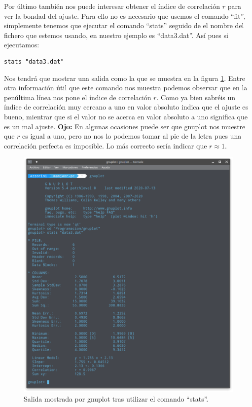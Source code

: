 \documentclass[11pt,a4paper,twoside,pdf]{article}
\numberwithin{equation}{section}
\begin{document}
Por último también nos puede interesar obtener el índice de correlación $r$ para ver la bondad del ajuste. Para ello no es necesario que usemos el comando ``fit'', simplemente tenemos que ejecutar el comando ``stats'' seguido de el nombre del fichero que estemos usando, en nuestro ejemplo es ``data3.dat''. Así pues si ejecutamos:

\begin{lstlisting}[language=Gnuplot]
stats "data3.dat"
\end{lstlisting}

Nos tendrá que mostrar una salida como la que se muestra en la figura \ref{fig:OutputStats}. Entre otra información útil que este comando nos muestra podemos observar que en la penúltima línea nos pone el índice de correlación $r$. Como ya bien sabréis un índice de correlación muy cercano a uno en valor absoluto indica que el ajuste es bueno, mientrar que si el valor no se acerca en valor absoluto a uno significa que es un mal ajuste. \textbf{Ojo:} En algunas ocasiones puede ser que gnuplot nos muestre que $r$ es igual a uno, pero no nos lo podemos tomar al pie de la letra pues una correlación perfecta es imposible. Lo más correcto sería indicar que $r \approx 1$.

\begin{figure}[h]
	\centering
	\includegraphics[scale=0.25]{Capturas/03_SalidaStats.png}
	\caption{Salida mostrada por gnuplot tras utilizar el comando ``stats''.}
	\label{fig:OutputStats}
\end{figure}
\end{document}
